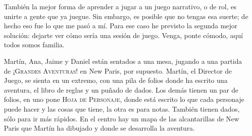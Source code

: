 También la mejor forma de aprender a jugar a un juego narrativo, o de rol, es unirte a gente que ya juegue. Sin embargo, es posible que no tengas esa suerte; de hecho eso fue lo que me pasó a mí. Para ese caso he previsto la segunda mejor solución: dejarte ver cómo sería una sesión de juego. Venga, ponte cómodo, aquí todos somos familia.

Martín, Ana, Jaime y Daniel están sentados a una mesa, jugando a una partida de \textsc{¡Grandes Aventuras!} en New Paris, por supuesto. Martín, el Director de Juego, se sienta en un extremo, con una pila de folios donde ha escrito una aventura, el libro de reglas y un puñado de dados. Los demás tienen un par de folios, en uno pone \textsc{Hoja de Personaje}, donde está escrito lo que cada personaje puede hacer y las cosas que tiene, la otra es para notas. También tienen dados, sólo para ir más rápidos. En el centro hay un mapa de las alcantarillas de New Paris que Martín ha dibujado y donde se desarrolla la aventura.

